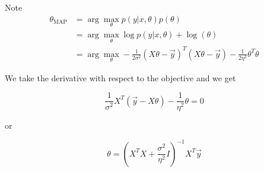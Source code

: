 \begin{answer}
    Note 
    $$
    \begin{aligned}
\theta_{\text{MAP}} &= \arg \max_\theta p(y|x, \theta)p(\theta)\\
&= \arg \max _\theta \log p(y|x, \theta) + \log (\theta)\\
&= \arg \max_\theta-\frac{1}{2\sigma^2} (X\theta - \vec{y})^T(X\theta - \vec{y}) - \frac{1}{2\eta^2}\theta^T\theta
\end{aligned}
$$

We take the derivative with respect to the objective and we get

$$
    \frac{1}{\sigma^2}X^T(\vec{y} - X\theta) - \frac{1}{\eta^2}\theta = 0
    $$

    or 

    $$
    \theta = (X^TX + \frac{\sigma^2}{\eta^2}I)^{-1}X^T\vec{y}
    $$
\end{answer}
